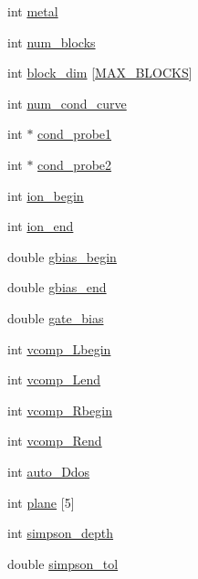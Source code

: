 \begin{DoxyCompactItemize}
int \hyperlink{struct_c_o_n_t_r_o_l_ad2908b127c8f86e8929c5cbdf6af7dd5}{metal}
\item 
int \hyperlink{struct_c_o_n_t_r_o_l_af6df8729731ac504a7850f453ea445f2}{num\-\_\-blocks}
\item 
int \hyperlink{struct_c_o_n_t_r_o_l_a6a54cfb835904acddaf6f78165a9bacc}{block\-\_\-dim} \mbox{[}\hyperlink{params__negf_8h_aba7f789f3266685ad8840806656e3692}{M\-A\-X\-\_\-\-B\-L\-O\-C\-K\-S}\mbox{]}
\item 
int \hyperlink{struct_c_o_n_t_r_o_l_a604a6656d8bb547780b9b809e32edc61}{num\-\_\-cond\-\_\-curve}
\item 
int $\ast$ \hyperlink{struct_c_o_n_t_r_o_l_a9b0c2f4070589219113902ba3bc08e59}{cond\-\_\-probe1}
\item 
int $\ast$ \hyperlink{struct_c_o_n_t_r_o_l_a252bf697c7dc750bd37f9ea66e480c17}{cond\-\_\-probe2}
\item 
int \hyperlink{struct_c_o_n_t_r_o_l_a82a65e7eebe171de893833ecaf4e1b9b}{ion\-\_\-begin}
\item 
int \hyperlink{struct_c_o_n_t_r_o_l_a7e3130e2fa551ceca54134a4856d0541}{ion\-\_\-end}
\item 
double \hyperlink{struct_c_o_n_t_r_o_l_ad953f687b99fafc2e77939623a5a3472}{gbias\-\_\-begin}
\item 
double \hyperlink{struct_c_o_n_t_r_o_l_a0fb2e8b1da95ab2c7571aebc8d7522e5}{gbias\-\_\-end}
\item 
double \hyperlink{struct_c_o_n_t_r_o_l_a74551effe7ed9a2a14adbb6d1903d591}{gate\-\_\-bias}
\item 
int \hyperlink{struct_c_o_n_t_r_o_l_a7d560dcb2275086c1d7aeccfa5da794b}{vcomp\-\_\-\-Lbegin}
\item 
int \hyperlink{struct_c_o_n_t_r_o_l_a438b79ba18a9d8ec5952938c8822b102}{vcomp\-\_\-\-Lend}
\item 
int \hyperlink{struct_c_o_n_t_r_o_l_ac84e25e20e0743553da6830777c91b50}{vcomp\-\_\-\-Rbegin}
\item 
int \hyperlink{struct_c_o_n_t_r_o_l_a2089cab4beb75e26f6c3198f5fe3fdd4}{vcomp\-\_\-\-Rend}
\item 
int \hyperlink{struct_c_o_n_t_r_o_l_ac8e8e10a6cfa7b9dd7fd67816c9c2846}{auto\-\_\-Ddos}
\item 
int \hyperlink{struct_c_o_n_t_r_o_l_adb24c66047d7d2e2c4992b59d1c03b30}{plane} \mbox{[}5\mbox{]}
\item 
int \hyperlink{struct_c_o_n_t_r_o_l_a6af34af5b51af180a545e0f101b6b3de}{simpson\-\_\-depth}
\item 
double \hyperlink{struct_c_o_n_t_r_o_l_a33ed3f7302129c8a3fcf6602275dfbcb}{simpson\-\_\-tol}

\end{DoxyCompactItemize}
